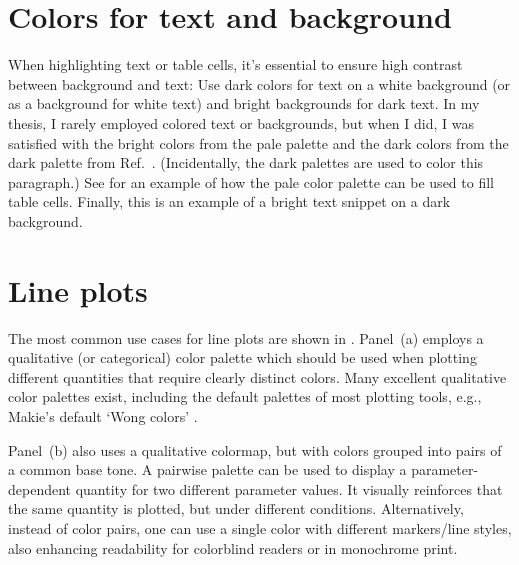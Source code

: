 \section{Colors for text and background}
{\color{dqblue} When highlighting text or table cells, it's essential to ensure high contrast between background and text:} 
{\color{dqcyan} Use dark colors for text on a white background (or as a background for white text) and bright backgrounds for dark text.}
{\color{dqgreen} In my thesis, I rarely employed colored text or backgrounds, but when I did, I was satisfied with the bright colors from the pale palette and the dark colors from the dark palette from Ref.~\cite{paultol}.} 
{\color{dqyellow}(Incidentally, the dark palettes are used to color this paragraph.)}
{\color{dqred} See  for an example of how the pale color palette can be used to fill table cells.}
\colorbox{dqblue}{\color{white}Finally, this} \colorbox{dqcyan}{\color{white}is an example} \colorbox{dqgreen}{\color{white}of a bright text} \colorbox{dqyellow}{\color{white}snippet on a} \colorbox{dqred}{\color{white}dark background.}

\section{Line plots}\label{sec:line_plots}

The most common use cases for line plots are shown in . 
Panel~(a) employs a qualitative (or categorical) color palette which should be used when plotting different quantities that require clearly distinct colors. Many excellent qualitative color palettes exist, including the default palettes of most plotting tools, e.g., Makie's default `Wong colors' \cite{wong2011}.

Panel~(b) also uses a qualitative colormap, but with colors grouped into pairs of a common base tone. A pairwise palette can be used to display a parameter-dependent quantity for two different parameter values. It visually reinforces that the same quantity is plotted, but under different conditions.
Alternatively, instead of color pairs, one can use a single color with different markers/line styles, also enhancing readability for colorblind readers or in monochrome print. 

